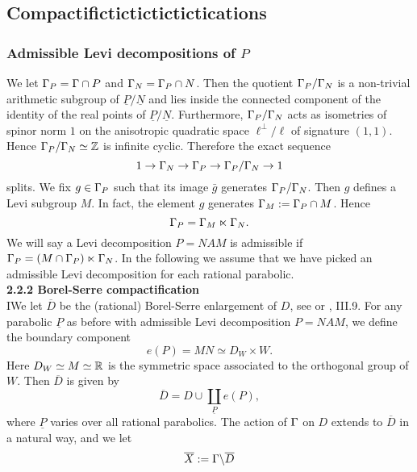 \subsection{Compactifictictictictictications}



\subsubsection{Admissible Levi decompositions of $P$}

We let $\Gamma_P = \Gamma \cap P$ and $\Gamma_N = \Gamma_P \cap N$. Then the quotient
$\Gamma_P/\Gamma_N$ is a non-trivial arithmetic subgroup of
$\underline{P}/\underline{N}$ and lies inside the connected component
of the identity of the real points of $\underline{P}/\underline{N}$.
Furthermore, $\Gamma_P/\Gamma_N$ acts as isometries of spinor norm $1$ on
the anisotropic quadratic space $\ell^{\perp}/\ell$  of signature
$(1,1)$. Hence $\Gamma_P/\Gamma_N \simeq \mathbb{Z}$ is infinite cyclic. Therefore
the exact sequence
\begin{equation*} \label{exactsequence}
1 \to \Gamma_N \to \Gamma_P \to \Gamma_P/\Gamma_N \to 1
\end{equation*}
splits. We fix $g \in \Gamma_P$ such that its image $\bar{g}$ generates
$\Gamma_P/\Gamma_N$. Then $g$ defines a Levi subgroup $M$. In fact, the
element $g$ generates $\Gamma_M :=\Gamma_P \cap M$. Hence
\[
\Gamma_P = \Gamma_M \ltimes \Gamma_N.
\]
We will say a Levi decomposition $P = NAM$ is admissible if $
\Gamma_P = (M \cap \Gamma_P) \ltimes \Gamma_N$. In the following we assume that
we have picked an admissible Levi decomposition for each rational
parabolic.
\\[12pt] 
\textbf{2.2.2 Borel-Serre compactification} 
\\[10pt]
IWe let $\overline{D}$ be the (rational) Borel-Serre enlargement
of $D$, see \cite{BorelSerre} or \cite{BJ}, III.9. For any parabolic
$\underline{P}$ as before with admissible Levi decomposition $P=NAM$,
we define the boundary component
\begin{equation*}
e({P}) = MN \simeq D_W \times W.
\end{equation*}
Here $D_W \simeq M \simeq \mathbb{R}$ is the symmetric space associated to the orthogonal group of $W$. Then $\overline{D}$ is given by 
\begin{equation*}
\overline{D} = D \cup \coprod_{\underline{P}} e({P}),
\end{equation*}
where $\underline{P}$ varies over all rational parabolics. The action of $\Gamma$ on $D$ extends to $\overline{D}$ in a natural way, and we let 
\begin{equation*}
\overline{X}:= \Gamma \backslash \overline{D}
\end{equation*}
